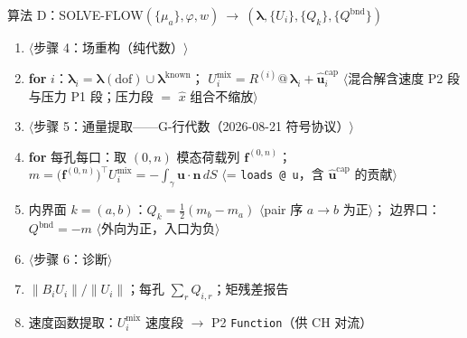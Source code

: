 \documentclass[11pt]{article}
\newcommand{\code}[1]{\texttt{#1}}
\newcommand{\iface}{\gamma}
\newcommand{\iu}{\hat{\bm u}}
\newcommand{\kwd}[1]{\textbf{#1}}
\newcommand{\cmt}[1]{{\color{cmtclr}$\langle$#1$\rangle$}}
\newenvironment{pseudo}[1]{\begin{algobox}{#1}%
  \begin{enumerate}[label={\ttfamily\arabic*}, leftmargin=3.4em, itemsep=1.5pt, topsep=1pt, parsep=0pt]}%
  {\end{enumerate}\end{algobox}}
\begin{document}
\begin{pseudo}{算法 D：SOLVE-FLOW$(\{\mu_a\},\varphi,w)\ \to\ (\bm\lambda,\{U_i\},\{Q_k\},\{Q^{\mathrm{bnd}}\})$}
线性残差 $\|S\bm\lambda-\bm{rhs}\|/\|\bm{rhs}\|$
\item[] \cmt{步骤 4：场重构（纯代数）}
\item \kwd{for} $i$：$\bm\lambda_i=\bm\lambda(\text{dof})\cup\bm\lambda^{\mathrm{known}}$；
$U_i^{\mathrm{mix}}=R^{(i)}@\,\bm\lambda_i+\iu^{\mathrm{cap}}_i$
\cmt{混合解含速度 P2 段与压力 P1 段；压力段 $=$ $\hat x$ 组合不缩放}
\item[] \cmt{步骤 5：通量提取——G-行代数（2026-08-21 符号协议）}
\item \kwd{for} 每孔每口：取 $(0,n)$ 模态荷载列 $\bm f^{(0,n)}$；
$m=\big(\bm f^{(0,n)}\big)^{\!\top}U_i^{\mathrm{mix}}=-\int_{\iface}\bm u\cdot\bm n\,dS$
\cmt{= \code{loads @ u}，含 $\iu^{\mathrm{cap}}$ 的贡献}
\item 内界面 $k=(a,b)$：$Q_k=\tfrac12(m_b-m_a)$ \cmt{pair 序 $a\!\to\!b$ 为正}；
边界口：$Q^{\mathrm{bnd}}=-m$ \cmt{外向为正，入口为负}
\item[] \cmt{步骤 6：诊断}
\item $\|B_iU_i\|/\|U_i\|$；每孔 $\sum_rQ_{i,r}$；矩残差报告
\item 速度函数提取：$U_i^{\mathrm{mix}}$ 速度段 $\to$ P2 \code{Function}（供 CH 对流）
\end{pseudo}
\end{document}
